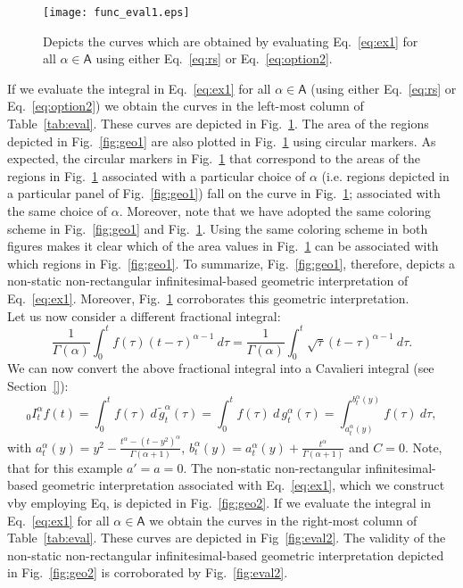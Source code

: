 \documentclass[twoside,reqno,11pt]{fcaa-var} %
\begin{document}
\begin{figure}[htb]
\centering
\texttt{[image: func\_eval1.eps]}
\caption{Depicts the curves which are obtained by evaluating Eq.~\eqref{eq:ex1} for all $\alpha\in \mathsf{A}$ using either Eq.~\eqref{eq:rs} or Eq.~\eqref{eq:option2}.}
\label{fig:eval1}
\end{figure}

\noindent
If we evaluate the integral in Eq.~\eqref{eq:ex1} for all $\alpha\in \mathsf{A}$ (using either Eq.~\eqref{eq:rs} or Eq.~\eqref{eq:option2}) we obtain the curves in the 
left-most column of Table~\ref{tab:eval}. These curves are depicted in Fig.~\ref{fig:eval1}.
The area of the regions depicted in Fig.~\ref{fig:geo1} are also plotted in Fig.~\ref{fig:eval1} using circular markers. As expected, the circular markers in Fig.~\ref{fig:eval1} that correspond to the areas of the regions in Fig.~\ref{fig:eval1}  
associated with a particular choice of $\alpha$ (i.e. regions depicted in a particular panel of Fig.~\ref{fig:geo1}) fall on the curve in Fig.~\ref{fig:eval1}; associated with the same choice of $\alpha$. Moreover, note that we have adopted the 
same coloring scheme in Fig.~\ref{fig:geo1} and Fig.~\ref{fig:eval1}. Using the same coloring scheme in both figures makes it clear which of the area values in Fig.~\ref{fig:eval1} can be associated with which regions in Fig.~\ref{fig:geo1}.
To summarize, Fig.~\ref{fig:geo1}, therefore, depicts a non-static non-rectangular infinitesimal-based geometric interpretation of Eq.~\eqref{eq:ex1}. Moreover, Fig.~\ref{fig:eval1} corroborates this geometric interpretation.\\

\noindent
Let us now consider a different fractional integral:
\begin{equation}
\label{eq:ex2}
\frac{1}{\Gamma(\alpha)}\int_0^t f(\tau) (t-\tau)^{\alpha-1}~d\tau = \frac{1}{\Gamma(\alpha)}\int_0^t \sqrt{\tau}(t-\tau)^{\alpha-1}~d\tau. 
\end{equation}
We can now convert the above fractional integral into a Cavalieri integral (see Section~\ref{}):
\begin{equation}
\label{eq:ex2_cav}
_0I_t^{\alpha} f(t) = \int_0^t f(\tau)~d\,\widetilde{g}_t^{\alpha}(\tau)=\int_0^t f(\tau)~d\,g_t^{\alpha}(\tau)=\int_{a_t^{\alpha}(y)}^{b_t^{\alpha}(y)} f(\tau)~d\tau,
\end{equation}
with $a_t^{\alpha}(y) = y^2 - \frac{t^{\alpha}-(t-y^2)^{\alpha}}{\Gamma(\alpha+1)}$, $b_t^{\alpha}(y) = a_t^{\alpha}(y) + \frac{t^{\alpha}}{\Gamma(\alpha+1)}$ and $C=0$.
Note, that for this example $a'=a=0$. The non-static non-rectangular infinitesimal-based geometric interpretation associated with Eq.~\eqref{eq:ex1}, which we construct vby employing Eq, is depicted in Fig.~\ref{fig:geo2}. If we evaluate the integral in Eq.~\eqref{eq:ex1} for all $\alpha\in \mathsf{A}$ we obtain the curves in the right-most column of Table~\ref{tab:eval}. These curves are depicted in Fig~\ref{fig:eval2}.
The validity of the non-static non-rectangular infinitesimal-based geometric interpretation depicted in Fig.~\ref{fig:geo2} is corroborated by Fig.~\ref{fig:eval2}. 
\end{document}
